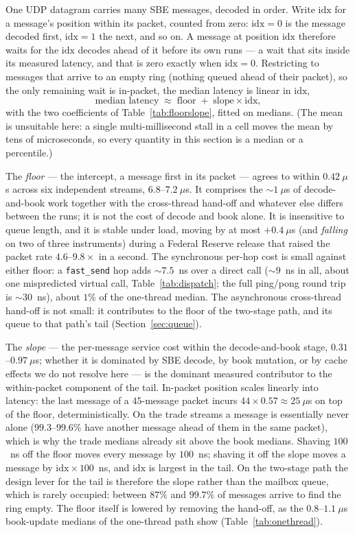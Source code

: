 \documentclass[11pt]{article}
\newcommand{\fs}{\texttt{fast\_send}}
\begin{document}
One UDP datagram carries many SBE messages, decoded in order. Write $\text{idx}$
for a message's position within its packet, counted from zero: $\text{idx}=0$ is
the message decoded first, $\text{idx}=1$ the next, and so on. A message at
position $\text{idx}$ therefore waits for the $\text{idx}$ decodes ahead of it
before its own runs --- a wait that sits inside its measured latency, and that is
zero exactly when $\text{idx}=0$. Restricting to messages that arrive to an empty
ring (nothing queued ahead of their packet), so the only remaining wait is
in-packet, the median latency is linear in $\text{idx}$,
\[
  \text{median latency} \;\approx\; \text{floor} \;+\; \text{slope}\times\text{idx},
\]
with the two coefficients of Table~\ref{tab:floorslope}, fitted on medians. (The
mean is unsuitable here: a single multi-millisecond stall in a cell moves the mean by
tens of microseconds, so every quantity in this section is a median or a
percentile.)

The \emph{floor} --- the intercept, a message first in its packet --- agrees to
within $0.42~\mu$s across six independent streams, $6.8$--$7.2~\mu$s. It
comprises the $\sim\!1~\mu$s of decode-and-book work together with the
cross-thread hand-off and whatever else differs between the runs; it is not the
cost of decode and book alone. It is insensitive to queue length, and it is
stable under
load, moving by at most $+0.4~\mu$s (and \emph{falling} on two of three
instruments) during a Federal Reserve release that raised the packet rate
$4.6$--$9.8\times$ in a second. The synchronous per-hop cost is small against
either floor: a \fs{} hop adds $\sim\!7.5$~ns over a direct call ($\sim\!9$~ns in
all, about one mispredicted virtual call, Table~\ref{tab:dispatch}; the full
ping/pong round trip is $\sim\!30$~ns), about $1\%$ of the one-thread median. The
asynchronous cross-thread hand-off is not small: it contributes to the floor of
the two-stage path, and its queue to that path's tail (Section~\ref{sec:queue}).

The \emph{slope} --- the per-message service cost within the decode-and-book
stage, $0.31$--$0.97~\mu$s; whether it is dominated by SBE decode, by book
mutation, or by cache effects we do not resolve here --- is the dominant measured
contributor to the within-packet component of the tail. In-packet position scales
linearly into latency: the last
message of a $45$-message packet incurs $44\times0.57 \approx 25~\mu$s on top of
the floor, deterministically. On the trade streams a message is essentially never alone
($99.3$--$99.6\%$ have another message ahead of them in the same packet), which is
why the trade medians already sit above the book medians. Shaving $100$~ns off the
floor moves every message by $100$~ns; shaving it off the slope moves a message by
$\text{idx}\times100$~ns, and $\text{idx}$ is largest in the tail. On the
two-stage path the design lever for the tail is therefore the slope rather than
the mailbox queue, which is rarely occupied: between $87\%$ and $99.7\%$ of
messages arrive to find the ring empty. The floor itself is lowered by removing
the hand-off, as the $0.8$--$1.1~\mu$s book-update medians of the one-thread path
show (Table~\ref{tab:onethread}).
\end{document}
